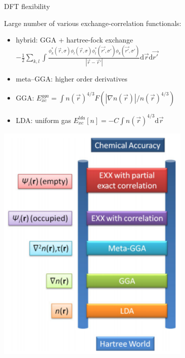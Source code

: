 \documentclass[slovene, usenames,dvipsnames]{beamer}
\newcommand{\dif}{\mathrm{d}}
\begin{document}
    \begin{frame}{DFT flexibility}
      \begin{minipage}[]{0.6\textwidth}
      Large number of various exchange-correlation functionals:
      \begin{itemize}
      \item hybrid: GGA + hartree-fock exchange
                \scriptsize
        $-\frac{1}{2}\sum_{k,l}\int \frac{
          \phi^*_k(\vec r,
        \sigma)\phi_l(\vec{r}, \sigma)
        \phi^*_l(\vec{r'}, \sigma')\phi_k(\vec{r'}, \sigma')}{|\vec r - \vec
        r'|}
      \dif \vec{r} \dif \vec{r'}$
     \item meta--GGA: higher order derivatives
     \item GGA:  \small{$E_{xc}^{gga}=\int n(\vec r)^{4/3}F(|\nabla n(\vec
          r)|/n(\vec r)^{4/3})$}
      \item LDA: uniform gas \small{
          $E_{xc}^{lda}[n]=-C\int n(\vec r)^{4/3} \dif \vec r$}
      \end{itemize}
      \end{minipage}%
    \begin{minipage}[]{0.4\textwidth}
      \centering
      \vspace{-0.5cm}
      \includegraphics[width=0.7\textwidth]{jacobs_functional_ladder_ver2.png}
      \end{minipage}
      \end{frame}
\end{document}
